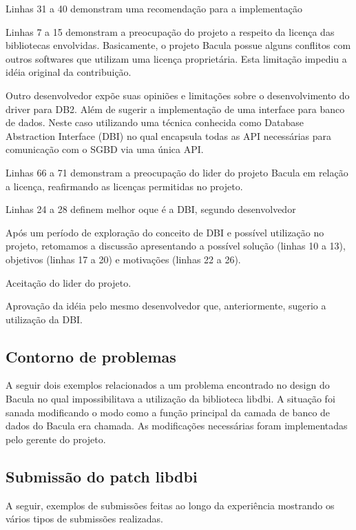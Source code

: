 Linhas 31 a 40 demonstram uma recomendação para a implementação


Linhas 7 a 15 demonstram a preocupação do projeto a respeito da licença das bibliotecas envolvidas. Basicamente, o projeto Bacula possue alguns conflitos com outros softwares que utilizam uma licença proprietária. Esta limitação  impediu a idéia original da contribuição.




Outro desenvolvedor expõe suas opiniões e limitações sobre o desenvolvimento do driver para DB2. Além de sugerir a implementação de uma interface para banco de dados. Neste caso utilizando uma técnica conhecida como Database Abstraction Interface (DBI) no qual encapsula todas as API necessárias para comunicação com o SGBD via uma única API. 


Linhas 66 a 71 demonstram a preocupação do lider do projeto Bacula em relação a licença, reafirmando as licenças permitidas no projeto.


Linhas 24 a 28 definem melhor oque é a DBI, segundo desenvolvedor


Após um período de exploração do conceito de DBI e possível utilização no projeto, retomamos a discussão apresentando a possível solução (linhas 10 a 13), objetivos (linhas 17 a 20) e motivações (linhas 22 a 26).


Aceitação do lider do projeto.


Aprovação da idéia pelo mesmo desenvolvedor que, anteriormente, sugerio a utilização da DBI.


\subsection{Contorno de problemas}\label{sec:anexod:problemas}
A seguir dois exemplos relacionados a um problema encontrado no design do Bacula no qual impossibilitava a utilização da biblioteca libdbi. A situação foi sanada modificando o modo como a função principal da camada de banco de dados do Bacula era chamada. As modificações necessárias foram implementadas pelo gerente do projeto.


\subsection{Submissão do patch libdbi}\label{sec:anexod:submissao}
A seguir, exemplos de submissões feitas ao longo da experiência mostrando os vários tipos de submissões realizadas.
